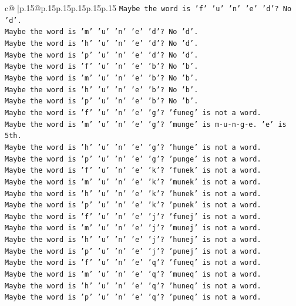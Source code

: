 \documentclass{article}
\begin{document}
{\begin{supertabular}{c@{$\;$}|p{.15\linewidth}@{}p{.15\linewidth}p{.15\linewidth}p{.15\linewidth}p{.15\linewidth}p{.15\linewidth}}
{{{\texttt{Maybe the word is 'f' 'u' 'n' 'e' 'd'? No 'd'.} \\
\texttt{Maybe the word is 'm' 'u' 'n' 'e' 'd'? No 'd'.} \\
\texttt{Maybe the word is 'h' 'u' 'n' 'e' 'd'? No 'd'.} \\
\texttt{Maybe the word is 'p' 'u' 'n' 'e' 'd'? No 'd'.} \\
\texttt{Maybe the word is 'f' 'u' 'n' 'e' 'b'? No 'b'.} \\
\texttt{Maybe the word is 'm' 'u' 'n' 'e' 'b'? No 'b'.} \\
\texttt{Maybe the word is 'h' 'u' 'n' 'e' 'b'? No 'b'.} \\
\texttt{Maybe the word is 'p' 'u' 'n' 'e' 'b'? No 'b'.} \\
\texttt{Maybe the word is 'f' 'u' 'n' 'e' 'g'? 'funeg' is not a word.} \\
\texttt{Maybe the word is 'm' 'u' 'n' 'e' 'g'? 'munge' is m{-}u{-}n{-}g{-}e. 'e' is 5th.} \\
\texttt{Maybe the word is 'h' 'u' 'n' 'e' 'g'? 'hunge' is not a word.} \\
\texttt{Maybe the word is 'p' 'u' 'n' 'e' 'g'? 'punge' is not a word.} \\
\texttt{Maybe the word is 'f' 'u' 'n' 'e' 'k'? 'funek' is not a word.} \\
\texttt{Maybe the word is 'm' 'u' 'n' 'e' 'k'? 'munek' is not a word.} \\
\texttt{Maybe the word is 'h' 'u' 'n' 'e' 'k'? 'hunek' is not a word.} \\
\texttt{Maybe the word is 'p' 'u' 'n' 'e' 'k'? 'punek' is not a word.} \\
\texttt{Maybe the word is 'f' 'u' 'n' 'e' 'j'? 'funej' is not a word.} \\
\texttt{Maybe the word is 'm' 'u' 'n' 'e' 'j'? 'munej' is not a word.} \\
\texttt{Maybe the word is 'h' 'u' 'n' 'e' 'j'? 'hunej' is not a word.} \\
\texttt{Maybe the word is 'p' 'u' 'n' 'e' 'j'? 'punej' is not a word.} \\
\texttt{Maybe the word is 'f' 'u' 'n' 'e' 'q'? 'funeq' is not a word.} \\
\texttt{Maybe the word is 'm' 'u' 'n' 'e' 'q'? 'muneq' is not a word.} \\
\texttt{Maybe the word is 'h' 'u' 'n' 'e' 'q'? 'huneq' is not a word.} \\
\texttt{Maybe the word is 'p' 'u' 'n' 'e' 'q'? 'puneq' is not a word.} \\
}}}
\end{supertabular}}
\end{document}
